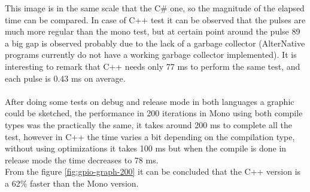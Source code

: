 This image is in the same scale that the C\# one, so the magnitude of the elapsed time can be compared.
In case of C++ test it can be observed that the pulses are much more regular than the mono test, but at certain point around the pulse 89 a big gap is observed probably due to the lack of a garbage collector (AlterNative programs currently do not have a working garbage collector implemented). It is interesting to remark that C++ needs only 77 ms to perform the same test, and each pulse is 0.43 ms on average.
\\
\\
After doing some tests on debug and release mode in both languages a graphic could be sketched, the performance in 200 iterations in Mono using both compile types was the practically the same, it takes around 200 ms to complete all the test, however in C++ the time varies a bit depending on the compilation type, without using optimizations it takes 100 ms but when the compile is done in release mode the time decreases to 78 ms.
\\
From the figure \ref{fig:gpio-graph-200} it can be concluded that the C++ version is a 62\% faster than the Mono version.
